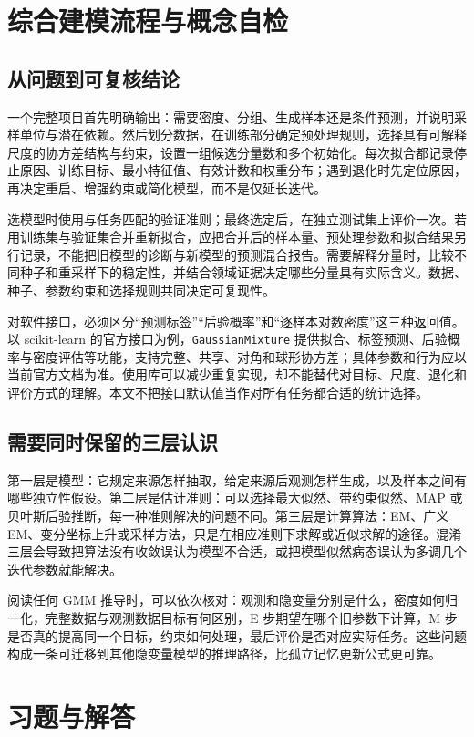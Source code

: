 \documentclass[UTF8]{ctexart}
\begin{document}
\section{综合建模流程与概念自检}
\label{sec:gmm-workflow}

\subsection{从问题到可复核结论}
一个完整项目首先明确输出：需要密度、分组、生成样本还是条件预测，并说明采样单位与潜在依赖。然后划分数据，在训练部分确定预处理规则，选择具有可解释尺度的协方差结构与约束，设置一组候选分量数和多个初始化。每次拟合都记录停止原因、训练目标、最小特征值、有效计数和权重分布；遇到退化时先定位原因，再决定重启、增强约束或简化模型，而不是仅延长迭代。

选模型时使用与任务匹配的验证准则；最终选定后，在独立测试集上评价一次。若用训练集与验证集合并重新拟合，应把合并后的样本量、预处理参数和拟合结果另行记录，不能把旧模型的诊断与新模型的预测混合报告。需要解释分量时，比较不同种子和重采样下的稳定性，并结合领域证据决定哪些分量具有实际含义。数据、种子、参数约束和选择规则共同决定可复现性。

对软件接口，必须区分“预测标签”“后验概率”和“逐样本对数密度”这三种返回值。以 scikit-learn 的官方接口为例，\texttt{GaussianMixture} 提供拟合、标签预测、后验概率与密度评估等功能，支持完整、共享、对角和球形协方差；具体参数和行为应以当前官方文档为准\cite{sklearn-gmm}。使用库可以减少重复实现，却不能替代对目标、尺度、退化和评价方式的理解。本文不把接口默认值当作对所有任务都合适的统计选择。

\subsection{需要同时保留的三层认识}
第一层是模型：它规定来源怎样抽取，给定来源后观测怎样生成，以及样本之间有哪些独立性假设。第二层是估计准则：可以选择最大似然、带约束似然、MAP 或贝叶斯后验推断，每一种准则解决的问题不同。第三层是计算算法：EM、广义 EM、变分坐标上升或采样方法，只是在相应准则下求解或近似求解的途径。混淆三层会导致把算法没有收敛误认为模型不合适，或把模型似然病态误认为多调几个迭代参数就能解决。

阅读任何 GMM 推导时，可以依次核对：观测和隐变量分别是什么，密度如何归一化，完整数据与观测数据目标有何区别，E 步期望在哪个旧参数下计算，M 步是否真的提高同一个目标，约束如何处理，最后评价是否对应实际任务。这些问题构成一条可迁移到其他隐变量模型的推理路径，比孤立记忆更新公式更可靠。

\section{习题与解答}
\label{sec:gmm-exercises}
\end{document}
